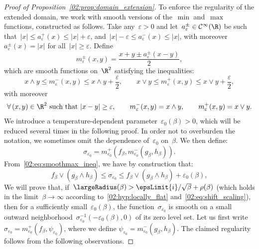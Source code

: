 \begin{proof}[Proof of Proposition~\ref{02:prop:domain_extension}]
        To enforce the regularity of the extended domain, we work with smooth versions of the~$\min$ and~$\max$ functions, constructed as follows. Take any~$\varepsilon>0$ and let~$a_\varepsilon^\pm\in \mathcal C^\infty(\R)$ be such that~$|x| \leq a^+_\varepsilon(x)\leq |x| + \varepsilon$, and~$|x|-\varepsilon\leq a^-_\varepsilon(x)\leq |x|$, with moreover~$a^\pm_\varepsilon(x) = |x|$ for all~$|x|\geq\varepsilon$.
        Define
        \[m^{\pm}_\varepsilon(x,y) = \frac{x+y\pm a^\pm_\varepsilon(x-y)}2,\]
        which are smooth functions on~$\R^2$ satisfying the inequalities:
        \begin{equation}
            \label{02:eq:smoothmax_ineq}
            x\land y \leq m^{-}_\varepsilon(x,y) \leq x\land y + \frac\varepsilon2,\qquad x\lor y \leq m^{+}_\varepsilon(x,y) \leq x\lor y + \frac\varepsilon2,
        \end{equation}
        with moreover
        \begin{equation}
        \label{02:eq:smoothmax_eq}
        \forall\,(x,y)\in\R^2\text{ such that }|x-y|\geq \varepsilon,\qquad m^{-}_\varepsilon(x,y) = x\land y,\qquad m^{+}_\varepsilon(x,y) = x\lor y.
    \end{equation}
        We introduce a temperature-dependent parameter~$\varepsilon_0(\beta)>0$, which will be reduced several times in the following proof. In order not to overburden the notation, we sometimes omit the dependence of~$\varepsilon_0$ on~$\beta$. We then define:
        $$\sigma_{\varepsilon_0} = m_{\varepsilon_0}^{+}(f_\beta,m_{\varepsilon_0}^{-}(g_\beta,h_\beta)).$$
        From~\eqref{02:eq:smoothmax_ineq}, we have by construction that:
        \begin{equation}
            \label{02:eq:sdf_ineq}
           f_\beta\lor (g_\beta\land h_\beta) \leq \sigma_{\varepsilon_0} \leq f_\beta\lor (g_\beta\land h_\beta) + \varepsilon_0(\beta),
        \end{equation}
        We will prove that, if~$\largeRadius(\beta)>\epsLimit{i}/\sqrt\beta + \rho(\beta)$ (which holds in the limit~$\beta\to\infty$ according to~\eqref{02:hyp:locally_flat} and~\eqref{02:eq:shift_scaling}), then for a sufficiently small~$\varepsilon_0(\beta)$, the function~$\sigma_{\varepsilon_0}$ is smooth on a small outward neighborhood~$\sigma_{\varepsilon_0}^{-1}(-\varepsilon_0(\beta),0)$ of its zero level set.
        Let us first write~$\sigma_{\varepsilon_0} = m_{\varepsilon_0}^{+}(f_\beta,\psi_{\varepsilon_0})$, where we define $\psi_{\varepsilon_0}=m_{\varepsilon_0}^{-}(g_\beta,h_\beta)$. The claimed regularity follows from the following observations.

\end{proof}
